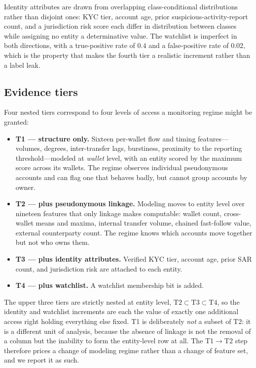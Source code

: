 \documentclass[11pt]{article}
\begin{document}
Identity attributes are drawn from overlapping class-conditional distributions rather than disjoint
ones: KYC tier, account age, prior suspicious-activity-report count, and a jurisdiction risk score
each differ in distribution between classes while assigning no entity a determinative value. The
watchlist is imperfect in both directions, with a true-positive rate of $0.4$ and a false-positive
rate of $0.02$, which is the property that makes the fourth tier a realistic increment rather than
a label leak.

\subsection{Evidence tiers}

Four nested tiers correspond to four levels of access a monitoring regime might be granted:

\begin{itemize}
  \item \textbf{T1 --- structure only.} Sixteen per-wallet flow and timing features---volumes,
        degrees, inter-transfer lags, burstiness, proximity to the reporting threshold---modeled at
        \emph{wallet} level, with an entity scored by the maximum score across its wallets. The
        regime observes individual pseudonymous accounts and can flag one that behaves badly, but
        cannot group accounts by owner.
  \item \textbf{T2 --- plus pseudonymous linkage.} Modeling moves to entity level over nineteen
        features that only linkage makes computable: wallet count, cross-wallet means and maxima,
        internal transfer volume, chained fast-follow value, external counterparty count. The regime
        knows which accounts move together but not who owns them.
  \item \textbf{T3 --- plus identity attributes.} Verified KYC tier, account age, prior SAR count,
        and jurisdiction risk are attached to each entity.
  \item \textbf{T4 --- plus watchlist.} A watchlist membership bit is added.
\end{itemize}

The upper three tiers are strictly nested at entity level, $\mathrm{T2} \subset \mathrm{T3} \subset
\mathrm{T4}$, so the identity and watchlist increments are each the value of exactly one additional
access right holding everything else fixed. T1 is deliberately \emph{not} a subset of T2: it is a
different unit of analysis, because the absence of linkage is not the removal of a column but the
inability to form the entity-level row at all. The T1$\to$T2 step therefore prices a change of
modeling regime rather than a change of feature set, and we report it as such.
\end{document}
